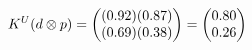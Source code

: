 \documentclass[preview]{standalone}
\begin{document}
\begin{align*}
\special{dvisvgm:raw <g id='unique000'>}K^U(d \otimes p) = \begin{pmatrix} (0.92)(0.87) \\ (0.69)(0.38) \end{pmatrix} = \begin{pmatrix} 0.80 \\ 0.26 \end{pmatrix}\special{dvisvgm:raw </g>}
\end{align*}
\end{document}
